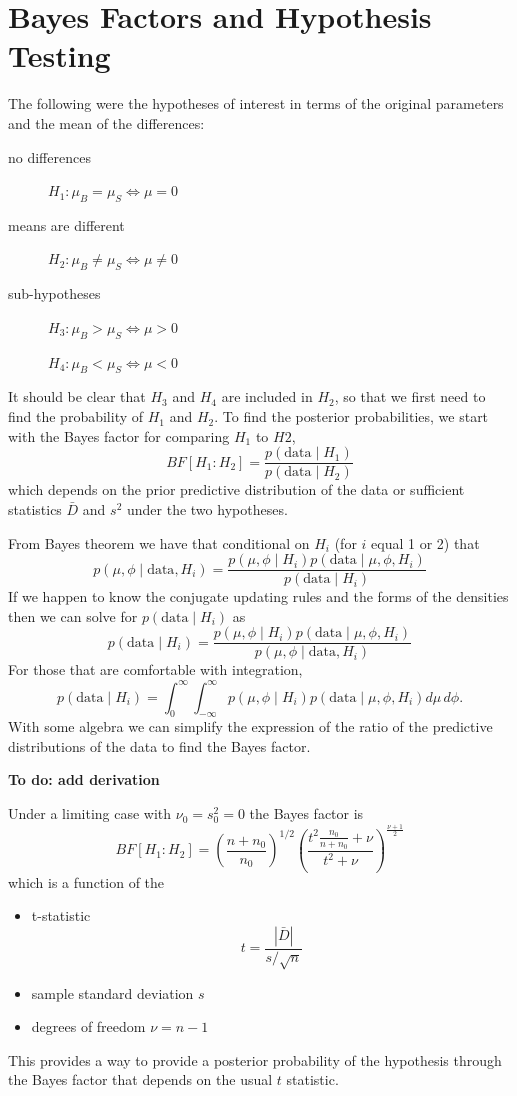 \documentclass[11pt]{article}
\def\BF{\textit{BF}}
\def\n0{n_0}
\def\data{\text{data}}
\begin{document}
\section*{Bayes Factors and Hypothesis Testing}

The following were the hypotheses of interest in terms of the original parameters and the mean of the differences:
\begin{description}%
\item [no differences] $H_1:  \mu_B = \mu_S  \Leftrightarrow \mu = 0 $   
\item [means are different] $H_2:  \mu_B \neq \mu_S \Leftrightarrow \mu  \neq 0 $ 
\item [sub-hypotheses]  $H_{3}:  \mu_B > \mu_S \Leftrightarrow \mu  > 0 $ 
\item [ ] $H_{4}:  \mu_B < \mu_S \Leftrightarrow \mu  < 0 $
\end{description}

It should be clear that $H_3$ and $H_4$ are included in $H_2$, so that we first need to find the probability of $H_1$ and $H_2$.    To find the posterior probabilities, we start with the Bayes factor for comparing $H_1$  to $H2$,
$$
\BF[H_1: H_2] = \frac{p(\data \mid H_1)} {p(\data \mid H_2)}
$$
which depends on the prior predictive distribution of the data or sufficient statistics $\bar{D}$ and $s^2$ under the two hypotheses. 


From Bayes theorem we have that conditional on $H_i$ (for $i$ equal 1 or 2) that
$$p(\mu, \phi  \mid \data, H_i) = \frac{p(\mu, \phi \mid H_i) p(\data \mid \mu, \phi, H_i)}{p(\data \mid H_i)}$$
If we happen to know the conjugate updating rules and the forms of the densities then we can solve for $p(\data \mid H_i)$ as
$$
p(\data \mid H_i) = \frac{p(\mu, \phi  \mid H_i) p(\data \mid \mu, \phi, H_i)}{p(\mu, \phi \mid \data, H_i)}
$$
For those that are comfortable with integration,
$$
p(\data \mid H_i) = \int_0^\infty \int_{-\infty}^\infty p(\mu, \phi  \mid H_i) p(\data \mid \mu, \phi, H_i) d \mu \, d \phi.
$$
With some algebra we can simplify the expression of the ratio of the predictive distributions of the data to find the Bayes factor. 

{\bf To do: add derivation}

Under a limiting case with $\nu_0 =s^2_0 = 0$ the Bayes factor is   
    $$
   \BF[H_1 : H_2] = \left(\frac{n + \n0}{\n0} \right)^{1/2} \left(
  \frac{ t^2  \frac{\n0}{n + \n0} + \nu }
  { t^2  + \nu} \right)^{\frac{\nu + 1}{2}}
    $$
which is a function of the 
\begin{itemize}
\item t-statistic $$t = \frac{|\bar{D}|}{s/\sqrt{n}}$$   
\item sample standard deviation $s$ 
\item degrees of freedom $\nu = n -1$
\end{itemize}

This provides a way to provide a posterior probability of the hypothesis through the Bayes factor that depends on the usual $t$ statistic. 
\end{document}
